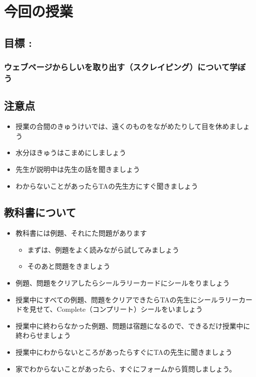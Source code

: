 
\clearpage\section{今回の授業}
\subsection*{目標 : }
\subsubsection*{ウェブページからしいを取り出す（スクレイピング）について学ぼう}

\subsection*{注意点}
\begin{itemize}
  \item 授業の合間のきゅうけいでは、遠くのものをながめたりして目を休めましょう
  \item 水分ほきゅうはこまめにしましょう
  \item 先生が説明中は先生の話を聞きましょう
  \item わからないことがあったらTAの先生方にすぐ聞きましょう
\end{itemize}
\subsection*{教科書について}
\begin{itemize}
  \item 教科書には例題、それにた問題があります
  \begin{itemize}
    \item まずは、例題をよく読みながら試してみましょう
    \item そのあと問題をきましょう
  \end{itemize}
  \item 例題、問題をクリアしたらシールラリーカードにシールをりましょう
  \item 授業中にすべての例題、問題をクリアできたらTAの先生にシールラリーカードを見せて、Complete（コンプリート）シールをいましょう
  \item 授業中に終わらなかった例題、問題は宿題になるので、できるだけ授業中に終わらせましょう
  \item 授業中にわからないところがあったらすぐにTAの先生に聞きましょう
  \item 家でわからないことがあったら、すぐにフォームから質問しましょう。
\end{itemize}

